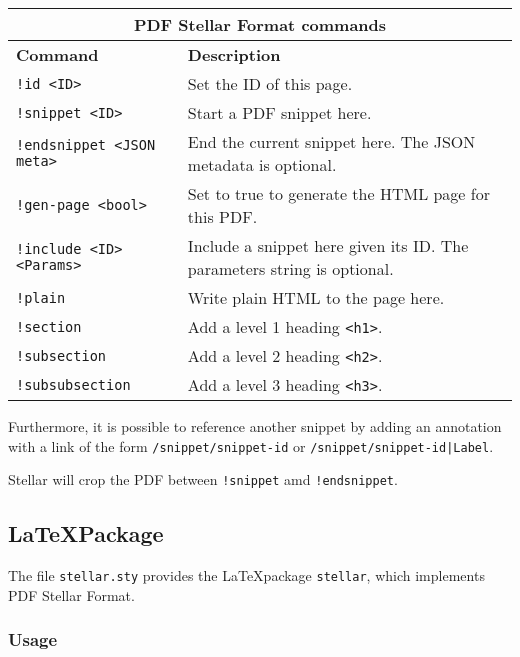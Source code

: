 \documentclass[a4paper]{article}
\begin{document}
\bgroup{}
\def\arraystretch{1.5}
\begin{center}
    \begin{tabular}{ |p{4.5cm}|p{8cm}| }
        \hline
        \multicolumn{2}{|c|}{\textbf{PDF Stellar Format commands}} \\
        \hline
        \textbf{Command} & \textbf{Description} \\
        \hline
        \texttt{!id <ID>} & Set the ID of this page. \\
        \hline
        \texttt{!snippet <ID>} & Start a PDF snippet here. \\
        \hline
        \texttt{!endsnippet <JSON meta>} & End the current snippet here. The JSON metadata is optional. \\
        \hline
        \texttt{!gen-page <bool>} & Set to true to generate the HTML page for this PDF. \\
        \hline
        \texttt{!include <ID> <Params>} & Include a snippet here given its ID. The parameters string is optional. \\
        \hline
        \texttt{!plain} & Write plain HTML to the page here. \\
        \hline
        \texttt{!section} & Add a level 1 heading \texttt{<h1>}. \\
        \hline
        \texttt{!subsection} & Add a level 2 heading \texttt{<h2>}. \\
        \hline
        \texttt{!subsubsection} & Add a level 3 heading \texttt{<h3>}. \\
        \hline
    \end{tabular}
\end{center}
\egroup{}

Furthermore, it is possible to reference another snippet by adding an annotation
with a link of the form \texttt{/snippet/snippet-id} or \texttt{/snippet/snippet-id|Label}.

Stellar will crop the PDF between \texttt{!snippet} amd \texttt{!endsnippet}.

\pagebreak

\subsection{\LaTeX Package}

The file \texttt{stellar.sty} provides the \LaTeX package \texttt{stellar}, which
implements PDF Stellar Format.

\subsubsection{Usage}
\end{document}
